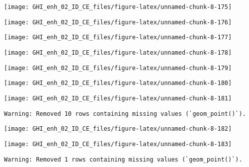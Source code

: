\documentclass[
  10pt,
  a4paper,oneside]{article}
\begin{document}
\begin{center}\texttt{[image: GHI\_enh\_02\_ID\_CE\_files/figure-latex/unnamed-chunk-8-175]} \end{center}

\begin{center}\texttt{[image: GHI\_enh\_02\_ID\_CE\_files/figure-latex/unnamed-chunk-8-176]} \end{center}

\begin{center}\texttt{[image: GHI\_enh\_02\_ID\_CE\_files/figure-latex/unnamed-chunk-8-177]} \end{center}

\begin{center}\texttt{[image: GHI\_enh\_02\_ID\_CE\_files/figure-latex/unnamed-chunk-8-178]} \end{center}

\begin{center}\texttt{[image: GHI\_enh\_02\_ID\_CE\_files/figure-latex/unnamed-chunk-8-179]} \end{center}

\begin{center}\texttt{[image: GHI\_enh\_02\_ID\_CE\_files/figure-latex/unnamed-chunk-8-180]} \end{center}

\begin{center}\texttt{[image: GHI\_enh\_02\_ID\_CE\_files/figure-latex/unnamed-chunk-8-181]} \end{center}

\begin{verbatim}
Warning: Removed 10 rows containing missing values (`geom_point()`).
\end{verbatim}

\begin{center}\texttt{[image: GHI\_enh\_02\_ID\_CE\_files/figure-latex/unnamed-chunk-8-182]} \end{center}

\begin{center}\texttt{[image: GHI\_enh\_02\_ID\_CE\_files/figure-latex/unnamed-chunk-8-183]} \end{center}

\begin{verbatim}
Warning: Removed 1 rows containing missing values (`geom_point()`).
\end{verbatim}
\end{document}
